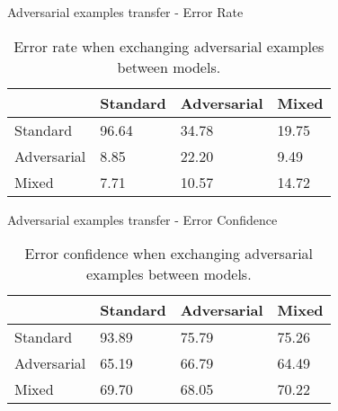 \begin{tframe}{Adversarial examples transfer - Error Rate}

\begin{table}[]
\centering
\label{my-label}
\begin{tabular}{@{}llll@{}}
\toprule
            & Standard & Adversarial & Mixed \\ \midrule
Standard    & 96.64    & 34.78       & 19.75 \\ 
Adversarial & 8.85     & 22.20       & 9.49  \\ 
Mixed       & 7.71     & 10.57       & 14.72 \\ \bottomrule
\end{tabular}
\caption{Error rate when exchanging adversarial examples between models.}
\end{table}

\end{tframe}


\begin{tframe}{Adversarial examples transfer - Error Confidence}

\begin{table}[]
\centering
\label{my-label}
\begin{tabular}{@{}llll@{}}
\toprule
            & Standard & Adversarial & Mixed \\ \midrule
Standard    & 93.89    & 75.79       & 75.26 \\ 
Adversarial & 65.19    & 66.79       & 64.49 \\ 
Mixed       & 69.70    & 68.05       & 70.22 \\ \bottomrule
\end{tabular}
\caption{Error confidence when exchanging adversarial examples between models.}
\end{table}

\end{tframe}